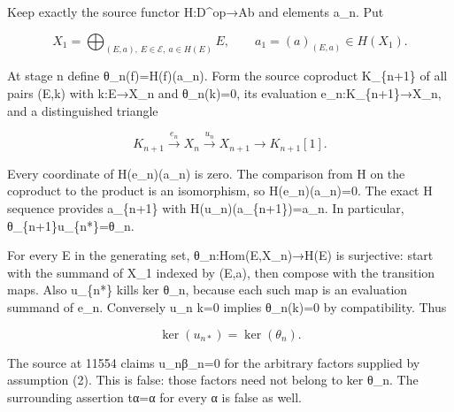 Keep exactly the source functor H:\allowbreak{}D\textasciicircum{}op\allowbreak{}→Ab and elements a\_\allowbreak{}n. Put

\[
 X_1=\bigoplus_{(E,a),\,E\in\mathcal E,\ a\in H(E)}E,\qquad
 a_1=(a)_{(E,a)}\in H(X_1).
\]

At stage n define θ\_\allowbreak{}n(f)\allowbreak{}\allowbreak{}=H(f)\allowbreak{}(a\_\allowbreak{}n)\allowbreak{}. Form the source coproduct K\_\allowbreak{}\{n\allowbreak{}+1\} of all pairs (E,\allowbreak{}k)\allowbreak{} with k:\allowbreak{}E\allowbreak{}→X\_\allowbreak{}n and θ\_\allowbreak{}n(k)\allowbreak{}\allowbreak{}=0,\allowbreak{} its evaluation e\_\allowbreak{}n:\allowbreak{}K\_\allowbreak{}\{n\allowbreak{}+1\}\allowbreak{}→X\_\allowbreak{}n,\allowbreak{} and a distinguished triangle

\[
 K_{n+1}\xrightarrow{e_n}X_n\xrightarrow{u_n}X_{n+1}
 \longrightarrow K_{n+1}[1].
\]

Every coordinate of H(e\_\allowbreak{}n)\allowbreak{}(a\_\allowbreak{}n)\allowbreak{} is zero. The comparison from H on the coproduct to the product is an isomorphism,\allowbreak{} so H(e\_\allowbreak{}n)\allowbreak{}(a\_\allowbreak{}n)\allowbreak{}\allowbreak{}=0. The exact H sequence provides a\_\allowbreak{}\{n\allowbreak{}+1\} with H(u\_\allowbreak{}n)\allowbreak{}(a\_\allowbreak{}\{n\allowbreak{}+1\})\allowbreak{}\allowbreak{}=a\_\allowbreak{}n. In particular,\allowbreak{} θ\_\allowbreak{}\{n\allowbreak{}+1\}u\_\allowbreak{}\{n*\}\allowbreak{}=θ\_\allowbreak{}n.

For every E in the generating set,\allowbreak{} θ\_\allowbreak{}n:\allowbreak{}Hom(E,\allowbreak{}X\_\allowbreak{}n)\allowbreak{}\allowbreak{}→H(E)\allowbreak{} is surjective:\allowbreak{} start with the summand of X\_\allowbreak{}1 indexed by (E,\allowbreak{}a)\allowbreak{},\allowbreak{} then compose with the transition maps. Also u\_\allowbreak{}\{n*\} kills ker θ\_\allowbreak{}n,\allowbreak{} because each such map is an evaluation summand of e\_\allowbreak{}n. Conversely u\_\allowbreak{}n k\allowbreak{}=0 implies θ\_\allowbreak{}n(k)\allowbreak{}\allowbreak{}=0 by compatibility. Thus

\[
 \ker(u_{n*})=\ker(\theta_n).
\]

The source at 11554 claims u\_\allowbreak{}nβ\_\allowbreak{}n\allowbreak{}=0 for the arbitrary factors supplied by assumption (2)\allowbreak{}. This is false:\allowbreak{} those factors need not belong to ker θ\_\allowbreak{}n. The surrounding assertion tα\allowbreak{}=α for every α is false as well.

